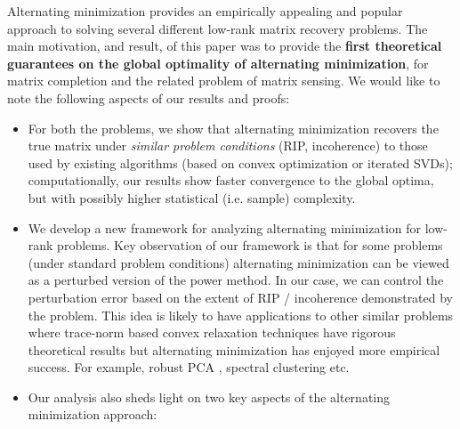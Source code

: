 \documentclass[11pt]{article}
\theoremstyle{plain}
\theoremstyle{definition}
\begin{document}




Alternating minimization provides an empirically appealing and popular approach to solving several different low-rank matrix recovery problems. The main motivation, and result, of this paper was to provide the {\bf first theoretical guarantees on the global optimality of alternating minimization}, for matrix completion and the related problem of matrix sensing. We would like to note the following aspects of our results and proofs:%
\begin{itemize}\setlength{\itemindent}{0pt}\setlength{\topsep}{-5pt}\setlength{\itemsep}{-3pt}
\item For both the problems, we show that alternating minimization recovers the true matrix under {\em similar problem conditions} (RIP, incoherence) to those used by existing algorithms (based on convex optimization or iterated SVDs); computationally, our results show faster convergence to the global optima, but with possibly higher statistical (i.e. sample) complexity.
\item We develop a new framework for analyzing alternating minimization for low-rank problems. Key observation of our framework is that for some problems (under standard problem conditions) alternating minimization can be viewed as a perturbed version of the power method. In our case, we can control the perturbation error based on the extent of RIP / incoherence demonstrated by the problem. This idea is likely to have applications to other similar problems where  trace-norm based convex relaxation techniques have rigorous theoretical results but  alternating minimization has enjoyed more empirical success. For example, robust PCA \cite{ChandrasekaranSPW11,CandesLMW11}, spectral clustering \cite{JalaliCSX11} etc. %
\item Our analysis also sheds light on two key aspects of the  alternating minimization approach:\\

\end{itemize}
\end{document}

